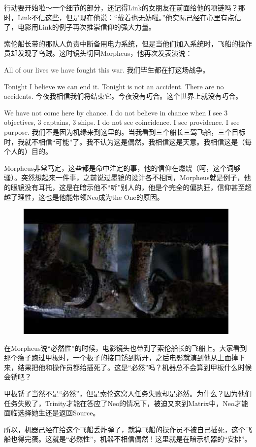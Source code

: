 \documentclass{ctexart}
\begin{document}
行动要开始啦～一个细节的部分，还记得Link的女朋友在前面给他的项链吗？那时，Link不信这些，但是现在他说：“戴着也无妨啦。”他实际己经在心里有点信了，电影用Link的例子再次推崇信仰的强大力量。

索伦船长带的那队人负责中断备用电力系统，但是当他们加入系统时，飞船的操作员却发现了乌贼。这时镜头切回Morpheus，他再次发表演说：

All of our lives we have fought this war. 我们毕生都在打这场战争。

Tonight I believe we can end it. Tonight is not an accident. There are no accidents. 今夜我相信我们将结束它。今夜没有巧合。这个世界上就没有巧合。

We have not come here by chance. I do not believe in chance when I see 3 objectives, 3 captains, 3 ships. I do not see coincidence. I see providence. I see purpose. 我们不是因为机缘来到这里的。当我看到三个船长三驾飞船，三个目标时，我就不相信“可能”了。我不认为这是偶然。我相信这是天意。我相信这是（每个人的）目的。

Morpheus非常笃定，这些都是命中注定的事，他的信仰在燃烧（呵，这个词够骚）。突然想起来一件事，之前说过墨镜的设计各不相同，Morpheus就是例子，他的眼镜没有耳托，这是在暗示他不“听”别人的，他是个完全的偏执狂，信仰甚至超越了理性，这也是他能带领Neo成为the One的原因。

\begin{figure}[htb]
\centering
\includegraphics[width=0.5\linewidth]{fig/read_reloaded-148}
\end{figure}

在Morpheus说“必然性”的时候，电影镜头也带到了索伦船长的飞船上。大家看到那个瘸子跑过甲板时，一个板子的接口锈到断开，之后电影就演到他从上面掉下来，结果把他和操作员都给插死了。这是“必然”吗？机器总不会算到甲板什么时候会锈吧？

甲板锈了当然不是“必然”，但是索伦这窝人任务失败却是必然。为什么？因为他们任务失败了，Trinity才能在答应了Neo的情况下，被迫又来到Matrix中，Neo才能面临选择她生还是返回Source。

所以，机器己经在给这个飞船丢炸弹了，就算飞船的操作员不被自己插死，这个飞船也得完蛋。这就是“必然性”，机器不相信偶然！这里就是在暗示机器的“安排”。
\end{document}

